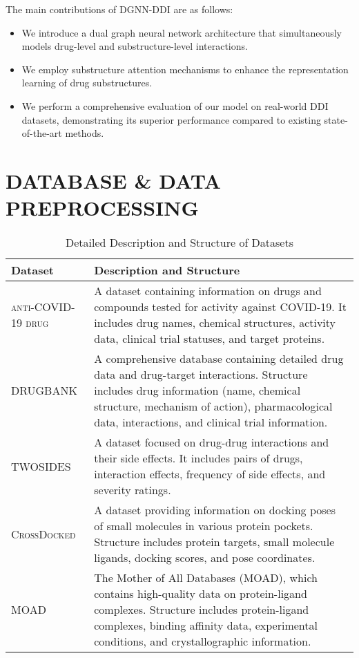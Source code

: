 \documentclass[12pt, a4paper,oneside]{book}
\begin{document}
The main contributions of DGNN-DDI are as follows:
\begin{itemize}
    \item We introduce a dual graph neural network architecture that simultaneously models drug-level and substructure-level interactions.
    \item We employ substructure attention mechanisms to enhance the representation learning of drug substructures.
    \item We perform a comprehensive evaluation of our model on real-world DDI datasets, demonstrating its superior performance compared to existing state-of-the-art methods.
\end{itemize}





\chapter{\selectfont DATABASE \& DATA PREPROCESSING}
\begin{table}[ht]\caption{Detailed Description and Structure of Datasets}
    \centering
    \begin{tabular}{|p{3cm}|p{12cm}|}
        \hline
        \textbf{Dataset} & \textbf{Description and Structure} \\
        \hline
        \textsc{anti-COVID-19 drug} & A dataset containing information on drugs and compounds tested for activity against COVID-19. It includes drug names, chemical structures, activity data, clinical trial statuses, and target proteins. \\
        \hline
        \textsc{DRUGBANK} & A comprehensive database containing detailed drug data and drug-target interactions. Structure includes drug information (name, chemical structure, mechanism of action), pharmacological data, interactions, and clinical trial information. \\
        \hline
        \textsc{TWOSIDES} & A dataset focused on drug-drug interactions and their side effects. It includes pairs of drugs, interaction effects, frequency of side effects, and severity ratings. \\
        \hline
        \textsc{CrossDocked} & A dataset providing information on docking poses of small molecules in various protein pockets. Structure includes protein targets, small molecule ligands, docking scores, and pose coordinates. \\
        \hline
        \textsc{MOAD} & The Mother of All Databases (MOAD), which contains high-quality data on protein-ligand complexes. Structure includes protein-ligand complexes, binding affinity data, experimental conditions, and crystallographic information. \\
        \hline
    \end{tabular}
    
    \label{tab:datasets}
\end{table}
\end{document}
